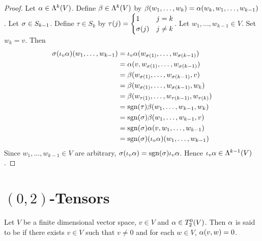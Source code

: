 \documentclass{book}
\begin{document}
	\begin{proof}
		Let $\alpha \in \Lambda^k(V)$. Define $\beta \in \Lambda^{k}(V)$ by $\beta(w_1, \ldots, w_k) = \alpha(w_k, w_1, \ldots, w_{k-1})$ . Let $\sigma \in S_{k-1}$. Define $\tau \in S_k$ by 
		$\tau(j) = 
		\begin{cases}
			1       & j = k \\
			\sigma(j) & j \neq k 
		\end{cases}$. 
		Let $w_1, \ldots, w_{k-1} \in V$. Set $w_k = v$. Then 
		\begin{align*}
			\sigma (\iota_v \alpha) (w_1, \ldots, w_{k-1})
			& = \iota_v \alpha (w_{\sigma(1)}, \ldots, w_{\sigma(k-1)}) \\
			& = \alpha (v, w_{\sigma(1)}, \ldots, w_{\sigma(k-1)}) \\
			& = \beta(w_{\sigma(1)}, \ldots, w_{\sigma(k-1)}, v) \\
			& = \beta(w_{\sigma(1)}, \ldots, w_{\sigma(k-1)}, w_k) \\
			& = \beta(w_{\tau(1)}, \ldots, w_{\tau(k-1)}, w_{\tau(k)}) \\
			& = \operatorname{sgn} (\tau) \beta (w_1, \ldots, w_{k-1}, w_k) \\
			& = \operatorname{sgn}(\sigma) \beta (w_1, \ldots, w_{k-1}, v) \\
			& = \operatorname{sgn}(\sigma) \alpha (v, w_1, \ldots, w_{k-1}) \\
			& = \operatorname{sgn}(\sigma) (\iota_v \alpha) (w_1, \ldots, w_{k-1})
		\end{align*}
		Since $w_1, \ldots, w_{k-1} \in V$ are arbitrary, $\sigma(\iota_v \alpha) = \operatorname{sgn}(\sigma) \iota_v \alpha$. Hence $\iota_v \alpha \in \Lambda^{k-1}(V)$.
	\end{proof}


























	
	\newpage
	\section{$(0,2)$-Tensors}
	\begin{defn}
		Let $V$ be a finite dimensional vector space, $v \in V$ and $\alpha \in T^0_2(V)$. Then $\alpha$ is said to be  if  there exists $v \in V$ such that $v \neq 0$ and for each $w \in V$, $\alpha(v, w) = 0$. 
	\end{defn}
\end{document}
